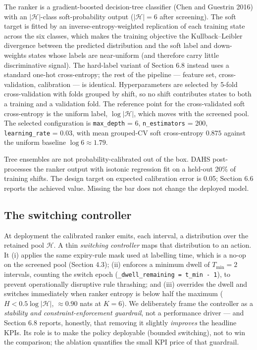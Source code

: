 \documentclass[review,3p,times]{elsarticle}
\theoremstyle{definition}
\begin{document}
The ranker is a gradient-boosted decision-tree classifier (Chen and
Guestrin 2016) with an \(|\mathcal{H}|\)-class soft-probability output
(\(|\mathcal{H}|=6\) after screening). The soft target is fitted by an
inverse-entropy-weighted replication of each training state across the
six classes, which makes the training objective the Kullback--Leibler
divergence between the predicted distribution and the soft label and
down-weights states whose labels are near-uniform (and therefore carry
little discriminative signal). The hard-label variant of Section 6.8
instead uses a standard one-hot cross-entropy; the rest of the pipeline
--- feature set, cross-validation, calibration --- is identical.
Hyperparameters are selected by 5-fold cross-validation with folds
grouped by shift, so no shift contributes states to both a training and
a validation fold. The reference point for the cross-validated soft
cross-entropy is the uniform label, \(\log|\mathcal{H}|\), which moves
with the screened pool. The selected configuration is
\texttt{max\_depth} = 6, \texttt{n\_estimators} = 200,
\texttt{learning\_rate} = 0.03, with mean grouped-CV soft cross-entropy
\(0.875\) against the uniform baseline \(\log 6 \approx 1.79\).

Tree ensembles are not probability-calibrated out of the box. DAHS
post-processes the ranker output with isotonic regression fit on a
held-out 20\% of training shifts. The design target on expected
calibration error is 0.05; Section 6.6 reports the achieved value.
Missing the bar does not change the deployed model.

\subsection{The switching controller}\label{the-switching-controller}

At deployment the calibrated ranker emits, each interval, a distribution
over the retained pool \(\mathcal{H}\). A thin \emph{switching
controller} maps that distribution to an action. It (i) applies the same
expiry-rule mask used at labelling time, which is a no-op on the
screened pool (Section 4.3); (ii) enforces a minimum dwell of
\(T_{\min} = 2\) intervals, counting the switch epoch
(\texttt{\_dwell\_remaining\ =\ t\_min\ -\ 1}), to prevent operationally
disruptive rule thrashing; and (iii) overrides the dwell and switches
immediately when ranker entropy is below half the maximum
(\(H < 0.5\log|\mathcal{H}|\), \(\approx 0.90\) nats at \(K=6\)). We
deliberately frame the controller as a \emph{stability and
constraint-enforcement guardrail}, not a performance driver --- and
Section 6.8 reports, honestly, that removing it slightly \emph{improves}
the headline KPIs. Its role is to make the policy deployable (bounded
switching), not to win the comparison; the ablation quantifies the small
KPI price of that guardrail.
\end{document}
